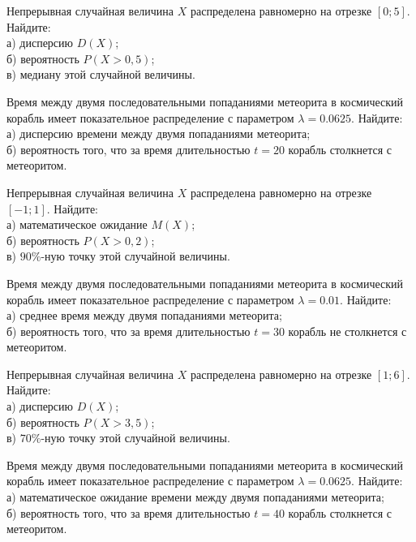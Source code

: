 \vfill

\newpage\setcounter{zad}{0}

\z Непрерывная случайная величина $X$ распределена равномерно на отрезке $[0; 5]$. Найдите: \\ \quad а) дисперсию $D(X)$; \\ \quad б) вероятность $P(X>0{,}5)$; \\ \quad в) медиану этой случайной величины.


\vfill

\z Время между двумя последовательными попаданиями метеорита в космический корабль имеет показательное распределение с параметром $\lambda = 0.0625$. Найдите: \\ \quad а) дисперсию времени между двумя попаданиями метеорита; \\ \quad б) вероятность того, что за время длительностью $t = 20$ корабль  столкнется с метеоритом.
 

\vfill

\newpage\setcounter{zad}{0}

\z Непрерывная случайная величина $X$ распределена равномерно на отрезке $[-1; 1]$. Найдите: \\ \quad а) математическое ожидание $M(X)$; \\ \quad б) вероятность $P(X>0{,}2)$; \\ \quad в) $90\%$-ную точку этой случайной величины.


\vfill

\z Время между двумя последовательными попаданиями метеорита в космический корабль имеет показательное распределение с параметром $\lambda = 0.01$. Найдите: \\ \quad а) среднее время между двумя попаданиями метеорита; \\ \quad б) вероятность того, что за время длительностью $t = 30$ корабль не столкнется с метеоритом.
 

\vfill

\newpage\setcounter{zad}{0}

\z Непрерывная случайная величина $X$ распределена равномерно на отрезке $[1; 6]$. Найдите: \\ \quad а) дисперсию $D(X)$; \\ \quad б) вероятность $P(X>3{,}5)$; \\ \quad в) $70\%$-ную точку этой случайной величины.


\vfill

\z Время между двумя последовательными попаданиями метеорита в космический корабль имеет показательное распределение с параметром $\lambda = 0.0625$. Найдите: \\ \quad а) математическое ожидание времени между двумя попаданиями метеорита; \\ \quad б) вероятность того, что за время длительностью $t = 40$ корабль  столкнется с метеоритом.
 

